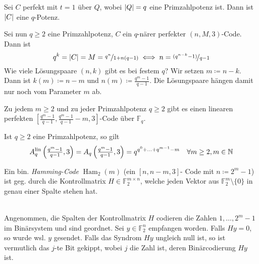 \documentclass{cheat-sheet}
\newcommand{\F}{\mathbb{F}} %
\newcommand{\lin}{\text{lin}} %
\DeclareMathOperator{\Ham}{Ham} %
\begin{document}
\begin{prop}
  Sei $C$ perfekt mit $t=1$ über $Q$, wobei $\lvert Q\rvert = q$ eine Primzahlpotenz ist.
  Dann ist $\lvert C\rvert$ eine $q$-Potenz.
\end{prop}

\begin{bem}
  Sei nun $q \geq 2$ eine Primzahlpotenz, $C$ ein $q$-närer perfekter $(n, M, 3)$-Code.
  Dann ist
  \[ q^k = \lvert C\rvert = M = \nicefrac{q^n}{1 + n(q-1)} \iff n = \nicefrac{(q^{n-k} - 1)}{q - 1} \]
  Wie viele Lösungspaare $(n, k)$ gibt es bei festem $q$?
  Wir setzen $m \coloneqq n - k$.
  Dann ist $k(m) \coloneqq n - m$ und $n(m) \coloneqq \tfrac{q^m - 1}{q - 1}$.
  Die Lösungspaare hängen damit nur noch vom Parameter $m$ ab.
\end{bem}


\begin{satz}
  Zu jedem $m \geq 2$ und zu jeder Primzahlpotenz $q \geq 2$ gibt es einen linearen perfekten $[\tfrac{q^m - 1}{q - 1}, \tfrac{q^m - 1}{q - 1} - m, 3]$-Code über $\F_q$.
\end{satz}

\begin{kor}
  Ist $q \geq 2$ eine Primzahlpotenz, so gilt
  \[
    A^\lin_q \left( \tfrac{q^m - 1}{q - 1}, 3 \right) =
    A_q \left( \tfrac{q^m - 1}{q - 1}, 3 \right) =
    q^{q^0 + \ldots + q^{m-1} - m}
    \quad
    \forall m \geq 2, m \in \N
  \]
\end{kor}



\begin{konstr}
  Ein bin. \emph{Hamming-Code} $\Ham_2(m)$ (ein $[n, n {-} m, 3]$- Code mit $n \coloneqq 2^m - 1$) ist geg. durch die Kontrollmatrix $H \in \F_2^{m \times n}$, welche jeden Vektor aus $\F_2^m \setminus \{ 0 \}$ in genau einer Spalte stehen hat.
\end{konstr}

\begin{alg}\mbox{}\\
  Angenommen, die Spalten der Kontrollmatrix $H$ codieren die Zahlen $1, \ldots, 2^m - 1$ im Binärsystem und sind geordnet.
  Sei $y \in \F_2^n$ empfangen worden.
  Falls $Hy = 0$, so wurde wsl. $y$ gesendet.
  Falls das Syndrom $Hy$ ungleich null ist, so ist vermutlich das $j$-te Bit gekippt, wobei $j$ die Zahl ist, deren Binärcodierung $Hy$ ist.
\end{alg}
\end{document}
